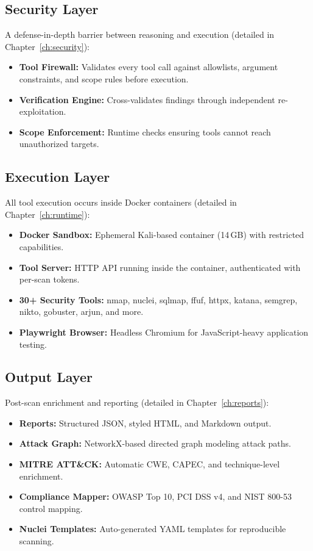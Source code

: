 \documentclass[12pt,a4paper,twoside]{report}
\begin{document}
\subsection{Security Layer}

A defense-in-depth barrier between reasoning and execution (detailed in Chapter~\ref{ch:security}):

\begin{itemize}
    \item \textbf{Tool Firewall:} Validates every tool call against allowlists, argument constraints, and scope rules before execution.
    \item \textbf{Verification Engine:} Cross-validates findings through independent re-exploitation.
    \item \textbf{Scope Enforcement:} Runtime checks ensuring tools cannot reach unauthorized targets.
\end{itemize}

\subsection{Execution Layer}

All tool execution occurs inside Docker containers (detailed in Chapter~\ref{ch:runtime}):

\begin{itemize}
    \item \textbf{Docker Sandbox:} Ephemeral Kali-based container (14\,GB) with restricted capabilities.
    \item \textbf{Tool Server:} HTTP API running inside the container, authenticated with per-scan tokens.
    \item \textbf{30+ Security Tools:} nmap, nuclei, sqlmap, ffuf, httpx, katana, semgrep, nikto, gobuster, arjun, and more.
    \item \textbf{Playwright Browser:} Headless Chromium for JavaScript-heavy application testing.
\end{itemize}

\subsection{Output Layer}

Post-scan enrichment and reporting (detailed in Chapter~\ref{ch:reports}):

\begin{itemize}
    \item \textbf{Reports:} Structured JSON, styled HTML, and Markdown output.
    \item \textbf{Attack Graph:} NetworkX-based directed graph modeling attack paths.
    \item \textbf{MITRE ATT\&CK:} Automatic CWE, CAPEC, and technique-level enrichment.
    \item \textbf{Compliance Mapper:} OWASP Top 10, PCI DSS v4, and NIST 800-53 control mapping.
    \item \textbf{Nuclei Templates:} Auto-generated YAML templates for reproducible scanning.
\end{itemize}
\end{document}
